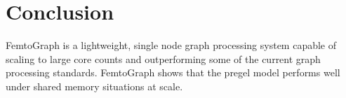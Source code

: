 \documentclass{sig-alternate-05-2015}
\begin{document}
\justify
\section{Conclusion}
FemtoGraph is a lightweight, single node graph processing system capable of scaling to large core counts and outperforming some of the current graph processing standards. FemtoGraph shows that the pregel model performs well under shared memory situations at scale.

 

%
%
\end{document}
